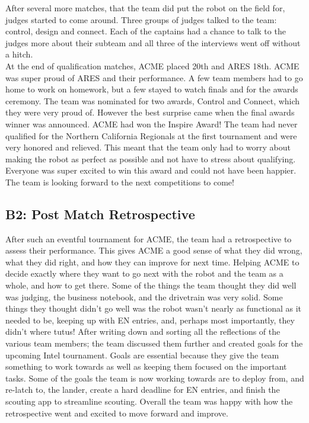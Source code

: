 \documentclass{article}
\begin{document}
After several more matches, that the team did put the robot on the field for, judges started to come around. Three groups of judges talked to the team: control, design and connect. Each of the captains had a chance to talk to the judges more about their subteam and all three of the interviews went off without a hitch. \\

At the end of qualification matches, ACME placed 20th and ARES 18th. ACME was super proud of ARES and their performance. A few team members had to go home to work on homework, but a few stayed to watch finals and for the awards ceremony. The team was nominated for two awards, Control and Connect, which they were very proud of. However the best surprise came when the final awards winner was announced. ACME had won the Inspire Award! The team had never qualified for the Northern California Regionals at the first tournament and were very honored and relieved. This meant that the team only had to worry about making the robot as perfect as possible and not have to stress about qualifying. Everyone was super excited to win this award and could not have been happier. The team is looking forward to the next competitions to come!\\

\subsection{B2: Post Match Retrospective}

After such an eventful tournament for ACME, the team had a retrospective to assess their performance. This gives ACME a good sense of what they did wrong, what they did right, and how they can improve for next time. Helping ACME to decide exactly where they want to go next with the robot and the team as a whole, and how to get there. Some of the things the team thought they did well was judging, the business notebook, and the drivetrain was very solid. Some things they thought didn’t go well was the robot wasn’t nearly as functional as it needed to be, keeping up with EN entries, and, perhaps most importantly, they didn’t where tutus! After writing down and sorting all the reflections of the various team members; the team discussed them further and created goals for the upcoming Intel tournament. Goals are essential because they give the team something to work towards as well as keeping them focused on the important tasks. Some of the goals the team is now working towards are to deploy from, and re-latch to, the lander, create a hard deadline for EN entries, and finish the scouting app to streamline scouting. Overall the team was happy with how the retrospective went and excited to move forward and improve. 
\end{document}
